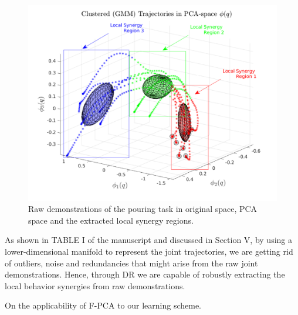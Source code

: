 \documentclass{article}
\begin{document}
\begin{figure}[!th]
\begin{minipage}{0.47\textwidth}
      	\vspace{-5pt}
      	
		\includegraphics[trim={0.8cm 0.5cm 0cm 0.35cm},clip,width=\linewidth]{../../src/JTDS_mat_lib/figures/local_synergy_regions_pour_annotated.pdf}
   \end{minipage}
   \caption{Raw demonstrations of the pouring task in original space, PCA space and the extracted local synergy regions. \label{fig:raw_demos}}
\end{figure}


As shown in TABLE I of the manuscript and discussed in Section V, by using a lower-dimensional manifold to represent the joint trajectories, we are getting rid of outliers, noise and redundancies that might arise from the raw joint demonstrations. Hence, through DR we are capable of robustly extracting the local behavior synergies from raw demonstrations. 



On the applicability of F-PCA to our learning scheme.



\end{document}
